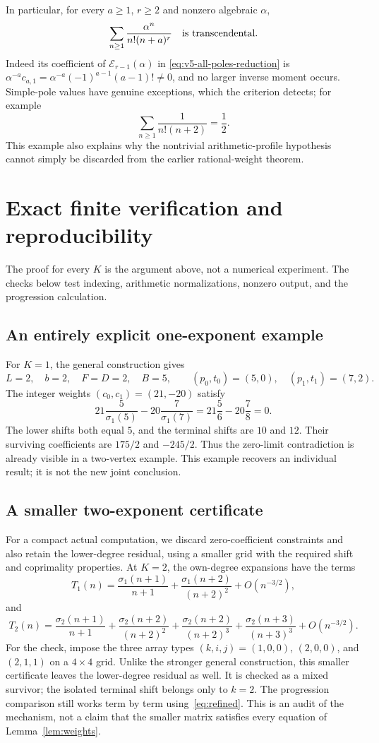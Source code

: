 In particular, for every $a\geq1$, $r\geq2$ and nonzero algebraic
$\alpha$,
\begin{equation}
 \sum_{n\geq1}\frac{\alpha^n}{n!(n+a)^r}
 \quad\hbox{is transcendental}.
 \label{eq:v5-repeated-poles-transcendental}
\end{equation}
Indeed its coefficient of $\mathcal E_{r-1}(\alpha)$ in
\eqref{eq:v5-all-poles-reduction} is
$\alpha^{-a}c_{a,1}=\alpha^{-a}(-1)^{a-1}(a-1)!\ne0$, and no
larger inverse moment occurs.  Simple-pole values have genuine
exceptions, which the criterion detects; for example
\[
 \sum_{n\geq1}\frac1{n!(n+2)}=\frac12.
\]
This example also explains why the nontrivial arithmetic-profile
hypothesis cannot simply be discarded from the earlier
rational-weight theorem.

\section{Exact finite verification and reproducibility}\label{sec:verification}
The proof for every $K$ is the argument above, not a numerical
experiment. The checks below test indexing, arithmetic normalizations,
nonzero output, and the progression calculation.

\subsection{An entirely explicit one-exponent example}
For $K=1$, the general construction gives
\[
 L=2,\quad b=2,\quad F=D=2,\quad B=5,
 \qquad(p_0,t_0)=(5,0),\quad(p_1,t_1)=(7,2).
\]
The integer weights $(c_0,c_1)=(21,-20)$ satisfy
\[
 21\frac5{\sigma_1(5)}-20\frac7{\sigma_1(7)}
       =21\frac56-20\frac78=0.
\]
The lower shifts both equal $5$, and the terminal shifts are $10$
and $12$. Their surviving coefficients are $175/2$ and $-245/2$.
Thus the zero-limit contradiction is already visible in a two-vertex
example. This example recovers an individual result; it is not the
new joint conclusion.

\subsection{A smaller two-exponent certificate}
For a compact actual computation, we discard zero-coefficient
constraints and also retain the lower-degree residual, using a smaller
grid with the required shift and coprimality properties. At $K=2$, the own-degree expansions have the terms
\[
 T_1(n)=\frac{\sigma_1(n+1)}{n+1}
        +\frac{\sigma_1(n+2)}{(n+2)^2}+O(n^{-3/2}),
\]
and
\[
 T_2(n)=\frac{\sigma_2(n+1)}{n+1}
       +\frac{\sigma_2(n+2)}{(n+2)^2}
       +\frac{\sigma_2(n+2)}{(n+2)^3}
       +\frac{\sigma_2(n+3)}{(n+3)^3}+O(n^{-3/2}).
\]
For the check, impose the three array types $(k,i,j)=(1,0,0)$,
$(2,0,0)$, and $(2,1,1)$ on a $4\times4$ grid. Unlike the
stronger general construction, this smaller certificate leaves the
lower-degree residual as well. It is checked as a mixed survivor;
the isolated terminal shift belongs only to $k=2$. The progression
comparison still works term by term using~\eqref{eq:refined}.
This is an audit of the mechanism, not a claim that the smaller
matrix satisfies every equation of Lemma~\ref{lem:weights}.


